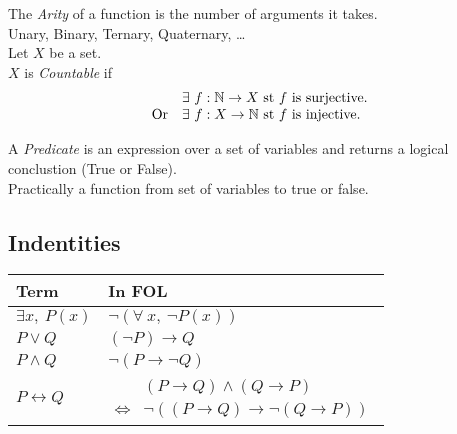 \documentclass[11pt,a4paper]{article}
\begin{document}
The \textit{Arity} of a function is the number of arguments it takes.\\
\nb Unary, Binary, Ternary, Quaternary, \dots\\

Let $X$ be a set.\\
$X$ is \textit{Countable} if
\[\begin{array}{rl}
&\exists\ f:\mathbb{N}\to X\text{ st }f\text{ is surjective}.\\
\text{Or}&\exists\ f:X\to\mathbb{N}\text{ st }f\text{ is injective}.
\end{array}\]

A \textit{Predicate} is an expression over a set of variables and returns a logical conclustion (\ie True or False).\\
\nb Practically a function from set of variables to true or false.

\subsection{Indentities}

\begin{center}
\begin{tabular}{|l|l|}
\hline
\textbf{Term}&\textbf{In FOL}\\
\hline
$\exists x,\ P(x)$&$\neg(\forall\ x,\ \neg P(x))$\\
$P\vee Q$&$(\neg P)\to Q$\\
$P\wedge Q$&$\neg(P\to\neg Q)$\\
$P\leftrightarrow Q$&$\begin{array}{rl}&(P\to Q)\wedge(Q\to P)\\\Leftrightarrow&\neg((P\to Q)\to\neg(Q\to P))\end{array}$\\
\hline
\end{tabular}
\end{center}
\end{document}
